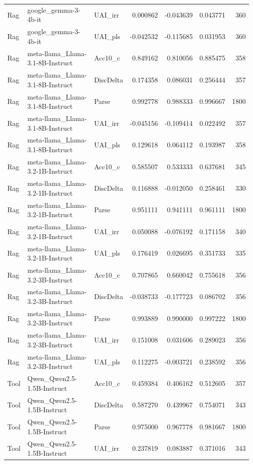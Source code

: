 \begin{tabular}{lllrrrr}
Rag & google_gemma-3-4b-it & UAI_irr & 0.000862 & -0.043639 & 0.043771 & 360 \\
Rag & google_gemma-3-4b-it & UAI_pls & -0.042532 & -0.115685 & 0.031953 & 360 \\
Rag & meta-llama_Llama-3.1-8B-Instruct & Acc10_c & 0.849162 & 0.810056 & 0.885475 & 358 \\
Rag & meta-llama_Llama-3.1-8B-Instruct & DiscDelta & 0.174358 & 0.086031 & 0.256444 & 357 \\
Rag & meta-llama_Llama-3.1-8B-Instruct & Parse & 0.992778 & 0.988333 & 0.996667 & 1800 \\
Rag & meta-llama_Llama-3.1-8B-Instruct & UAI_irr & -0.045156 & -0.109414 & 0.022492 & 357 \\
Rag & meta-llama_Llama-3.1-8B-Instruct & UAI_pls & 0.129618 & 0.064112 & 0.193987 & 358 \\
Rag & meta-llama_Llama-3.2-1B-Instruct & Acc10_c & 0.585507 & 0.533333 & 0.637681 & 345 \\
Rag & meta-llama_Llama-3.2-1B-Instruct & DiscDelta & 0.116888 & -0.012050 & 0.258461 & 330 \\
Rag & meta-llama_Llama-3.2-1B-Instruct & Parse & 0.951111 & 0.941111 & 0.961111 & 1800 \\
Rag & meta-llama_Llama-3.2-1B-Instruct & UAI_irr & 0.050088 & -0.076192 & 0.171158 & 340 \\
Rag & meta-llama_Llama-3.2-1B-Instruct & UAI_pls & 0.176419 & 0.026695 & 0.351733 & 335 \\
Rag & meta-llama_Llama-3.2-3B-Instruct & Acc10_c & 0.707865 & 0.660042 & 0.755618 & 356 \\
Rag & meta-llama_Llama-3.2-3B-Instruct & DiscDelta & -0.038733 & -0.177723 & 0.086702 & 356 \\
Rag & meta-llama_Llama-3.2-3B-Instruct & Parse & 0.993889 & 0.990000 & 0.997222 & 1800 \\
Rag & meta-llama_Llama-3.2-3B-Instruct & UAI_irr & 0.151008 & 0.031606 & 0.289023 & 356 \\
Rag & meta-llama_Llama-3.2-3B-Instruct & UAI_pls & 0.112275 & -0.003721 & 0.238592 & 356 \\
Tool & Qwen_Qwen2.5-1.5B-Instruct & Acc10_c & 0.459384 & 0.406162 & 0.512605 & 357 \\
Tool & Qwen_Qwen2.5-1.5B-Instruct & DiscDelta & 0.587270 & 0.439967 & 0.754071 & 343 \\
Tool & Qwen_Qwen2.5-1.5B-Instruct & Parse & 0.975000 & 0.967778 & 0.981667 & 1800 \\
Tool & Qwen_Qwen2.5-1.5B-Instruct & UAI_irr & 0.237819 & 0.083887 & 0.371016 & 343 \\

\end{tabular}
